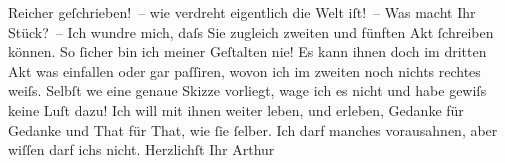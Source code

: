 \begin{ledgroupsized}[t]{13cm}
                  Reicher geſchrieben! – wie verdreht
               eigentlich die Welt iſt! –\pend
           \pstart
           Was macht Ihr Stück? – Ich
               wundre mich, daſs Sie zugleich zweiten und fünften Akt ſchreiben können. So ſicher
               bin ich meiner Geſtalten nie! Es kann ihnen doch im dritten Akt {\pb}was einfallen oder gar paſſiren, wovon ich im zweiten noch
               nichts rechtes weiſs. Selbſt we{\geminationn} eine genaue Skizze
               vorliegt, wage ich es nicht und habe gewiſs keine Luſt dazu! Ich will mit ihnen
               weiter leben, und erleben, Gedanke für Gedanke und That für That, wie ſie ſelber. Ich
               darf manches vorausahnen, aber wiſſen darf ichs nicht.\pend
           \pstart Herzlichſt Ihr \spacefill\mbox{Arthur}\pend{}
         
         \endnumbering{}\end{ledgroupsized}  \newcommand{\dateiname}{L00109}\newcommand{\titel}{Arthur Schnitzler an Hugo von Hofmannsthal, 29. 7. 1892}\newcommand{\editorInnen}{Martin Anton Müller und Gerd-Hermann Susen}
      
